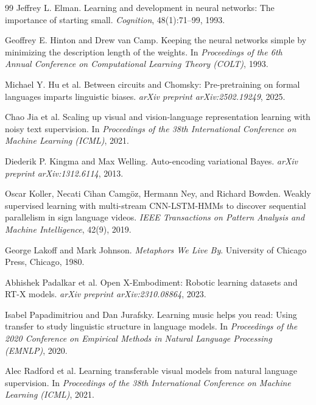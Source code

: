 \documentclass[11pt]{article}
\begin{document}
\begin{thebibliography}{99}
Jeffrey L. Elman.
\newblock Learning and development in neural networks: The importance of starting small.
\newblock \emph{Cognition}, 48(1):71--99, 1993.

Geoffrey E. Hinton and Drew van Camp.
\newblock Keeping the neural networks simple by minimizing the description length of the weights.
\newblock In \emph{Proceedings of the 6th Annual Conference on Computational Learning Theory (COLT)}, 1993.

Michael Y. Hu et al.
\newblock Between circuits and Chomsky: Pre-pretraining on formal languages imparts linguistic biases.
\newblock \emph{arXiv preprint arXiv:2502.19249}, 2025.

Chao Jia et al.
\newblock Scaling up visual and vision-language representation learning with noisy text supervision.
\newblock In \emph{Proceedings of the 38th International Conference on Machine Learning (ICML)}, 2021.

Diederik P. Kingma and Max Welling.
\newblock Auto-encoding variational Bayes.
\newblock \emph{arXiv preprint arXiv:1312.6114}, 2013.

Oscar Koller, Necati Cihan Camg\"{o}z, Hermann Ney, and Richard Bowden.
\newblock Weakly supervised learning with multi-stream CNN-LSTM-HMMs to discover sequential parallelism in sign language videos.
\newblock \emph{IEEE Transactions on Pattern Analysis and Machine Intelligence}, 42(9), 2019.

George Lakoff and Mark Johnson.
\newblock \emph{Metaphors We Live By}.
\newblock University of Chicago Press, Chicago, 1980.

Abhishek Padalkar et al.
\newblock Open X-Embodiment: Robotic learning datasets and RT-X models.
\newblock \emph{arXiv preprint arXiv:2310.08864}, 2023.

Isabel Papadimitriou and Dan Jurafsky.
\newblock Learning music helps you read: Using transfer to study linguistic structure in language models.
\newblock In \emph{Proceedings of the 2020 Conference on Empirical Methods in Natural Language Processing (EMNLP)}, 2020.

Alec Radford et al.
\newblock Learning transferable visual models from natural language supervision.
\newblock In \emph{Proceedings of the 38th International Conference on Machine Learning (ICML)}, 2021.


\end{thebibliography}
\end{document}
